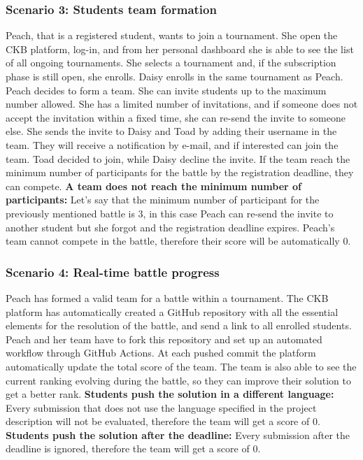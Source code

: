 \subsubsection{Scenario 3: Students team formation}
Peach, that is a registered student, wants to join a tournament. She open the CKB platform, log-in, and from her personal dashboard she is able to see the list of all ongoing tournaments. She selects a tournament and, if the subscription phase is still open, she enrolls.
Daisy enrolls in the same tournament as Peach. \newline
Peach decides to form a team. She can invite students up to the maximum number allowed. She has a limited number of invitations, and if someone does not accept the invitation within a fixed time, she can re-send the invite to someone else.
She sends the invite to Daisy and Toad by adding their username in the team. They will receive a notification by e-mail, and if interested can join the team. Toad decided to join, while Daisy decline the invite. \newline
If the team reach the minimum number of participants for the battle by the registration deadline, they can compete. \newline
\textbf{A team does not reach the minimum number of participants:} Let's say that the minimum number of participant for the  previously mentioned battle is 3, in this case Peach can re-send the invite to another student but she forgot and the registration deadline expires.
Peach's team cannot compete in the battle, therefore their score will be automatically 0.

\subsubsection{Scenario 4: Real-time battle progress}
Peach has formed a valid team for a battle within a tournament. The CKB platform has automatically created a GitHub repository with all the essential elements for the resolution of the battle, and send a link to all enrolled students.
Peach and her team have to fork this repository and set up an automated workflow 
through GitHub Actions. At each pushed commit the platform automatically update the total score of the team. The team is also able to see the current ranking evolving during the battle, so they can improve their solution to get a better rank.\newline
\textbf{Students push the solution in a different language:} Every submission that does not use the language specified in the project description will not be evaluated, therefore the team will get a score of 0.  \newline
\textbf{Students push the solution after the deadline:} Every submission after the deadline is ignored, therefore the team will get a score of 0. 

